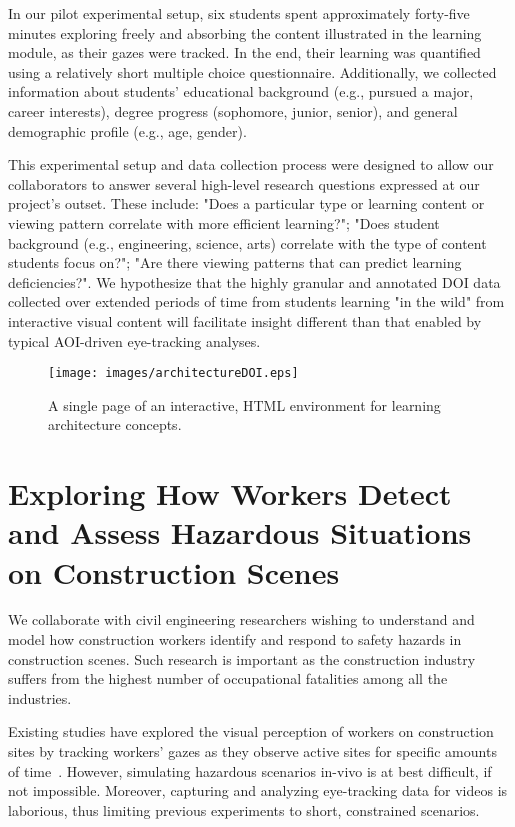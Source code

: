 In our pilot experimental setup, six students spent approximately forty-five minutes exploring freely and absorbing the content illustrated in the learning module, as their gazes were tracked. In the end, their learning was quantified using a relatively short multiple choice questionnaire. Additionally, we collected information about students' educational background (e.g., pursued a major, career interests), degree progress (sophomore, junior, senior), and general demographic profile (e.g., age, gender).

This experimental setup and data collection process were designed to allow our collaborators to answer several high-level research questions expressed at our project's outset. These include: "Does a particular type or learning content or viewing pattern correlate with more efficient learning?"; "Does student background (e.g., engineering, science, arts) correlate with the type of content students focus on?"; "Are there viewing patterns that can predict learning deficiencies?". We hypothesize that the highly granular and annotated DOI data collected over extended periods of time from students learning "in the wild" from interactive visual content will facilitate insight different than that enabled by typical AOI-driven eye-tracking analyses.

\begin{figure}[htbp]
  \centering
  \texttt{[image: images/architectureDOI.eps]}
  \caption{A single page of an interactive, HTML environment for learning architecture concepts.}
	\label{fig:archictecture}
\end{figure}

\section{Exploring How Workers Detect and Assess Hazardous Situations on Construction Scenes}
\label{sec:ExperimentConstruction}
We collaborate with civil engineering researchers wishing to understand and model how construction workers identify and respond to safety hazards in construction scenes. Such research is important as the construction industry  suffers from the highest  number of  occupational fatalities  among all  the industries. 

Existing studies have explored the visual perception of workers on construction sites by tracking workers' gazes as they observe active sites for specific amounts of time~\cite{SafetyPerf}. However, simulating hazardous scenarios in-vivo is at best difficult, if not impossible. 
Moreover, capturing and analyzing eye-tracking data for videos is laborious, thus limiting previous experiments to short, constrained scenarios. 

